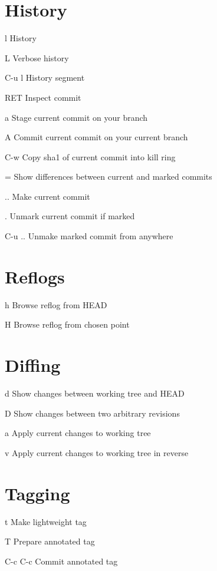 \documentclass[9pt,a4paper,landscape]{extarticle}
\begin{document}
\begin{multicols}{3}
\section{History}
\begin{eqlist}
\item[l] History
\item[L] Verbose history
\item[C-u l] History segment
\item[RET] Inspect commit
\item[a] Stage current commit on your branch
\item[A] Commit current commit on your current branch
\item[C-w] Copy sha1 of current commit into kill ring
\item[=] Show differences between current and marked commits
\item[..] Make current commit
\item[.] Unmark current commit if marked
\item[C-u ..] Unmake marked commit from anywhere
\end{eqlist}

\section{Reflogs}
\begin{eqlist}
\item[h] Browse reflog from HEAD
\item[H] Browse reflog from chosen point
\end{eqlist}

\section{Diffing}
\begin{eqlist}
\item[d] Show changes between working tree and HEAD
\item[D] Show changes between two arbitrary revisions
\item[a] Apply current changes to working tree
\item[v] Apply current changes to working tree in reverse
\end{eqlist}

\section{Tagging}
\begin{eqlist}
\item[t] Make lightweight tag
\item[T] Prepare annotated tag
\item[C-c C-c] Commit annotated tag
\end{eqlist}


\end{multicols}
\end{document}
